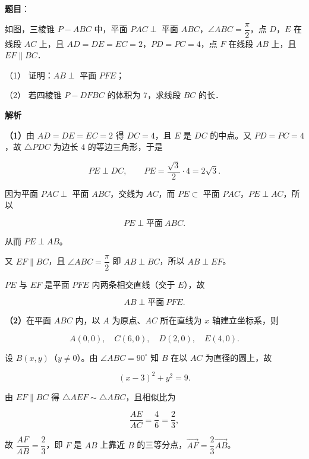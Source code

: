 \begin{answer}

\textbf{题目}：

如图，三棱锥 $P-ABC$ 中，平面 $PAC\perp$ 平面 $ABC$，$\angle ABC=\dfrac{\pi}{2}$，点 $D$，$E$ 在线段 $AC$ 上，且 $AD=DE=EC=2$，$PD=PC=4$，点 $F$ 在线段 $AB$ 上，且 $EF\parallel BC$．

（1） 证明：$AB\perp$ 平面 $PFE$；

（2） 若四棱锥 $P-DFBC$ 的体积为 $7$，求线段 $BC$ 的长．
\nopagebreak[4]
\begin{center}\end{center}
\nopagebreak[4]
\textbf{解析}

\textbf{（1）}由 $AD=DE=EC=2$ 得 $DC=4$，且 $E$ 是 $DC$ 的中点。又 $PD=PC=4$，故 $\triangle PDC$ 为边长 $4$ 的等边三角形，于是

\nopagebreak[4]
\[
PE\perp DC,\qquad PE=\frac{\sqrt{3}}{2}\cdot 4=2\sqrt{3}.
\]

因为平面 $PAC\perp$ 平面 $ABC$，交线为 $AC$，而 $PE\subset$ 平面 $PAC$，$PE\perp AC$，所以

\nopagebreak[4]
\[
PE\perp\text{平面}\ ABC.
\]

从而 $PE\perp AB$。

又 $EF\parallel BC$，且 $\angle ABC=\dfrac{\pi}{2}$ 即 $AB\perp BC$，所以 $AB\perp EF$。

$PE$ 与 $EF$ 是平面 $PFE$ 内两条相交直线（交于 $E$），故

\nopagebreak[4]
\[
AB\perp\text{平面}\ PFE.
\]

\textbf{（2）}在平面 $ABC$ 内，以 $A$ 为原点、$AC$ 所在直线为 $x$ 轴建立坐标系，则

\nopagebreak[4]
\[
A(0,0),\quad C(6,0),\quad D(2,0),\quad E(4,0).
\]

设 $B(x,y)$（$y\ne0$）。由 $\angle ABC=90^{\circ}$ 知 $B$ 在以 $AC$ 为直径的圆上，故

\nopagebreak[4]
\[
(x-3)^{2}+y^{2}=9.
\]

由 $EF\parallel BC$ 得 $\triangle AEF\sim\triangle ABC$，且相似比为

\nopagebreak[4]
\[
\frac{AE}{AC}=\frac{4}{6}=\frac{2}{3},
\]

故 $\dfrac{AF}{AB}=\dfrac{2}{3}$，即 $F$ 是 $AB$ 上靠近 $B$ 的三等分点，$\overrightarrow{AF}=\dfrac{2}{3}\overrightarrow{AB}$。


\end{answer}
